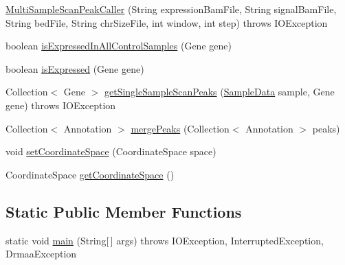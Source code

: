 \begin{DoxyCompactItemize}
\item 
\hyperlink{classbroad_1_1pda_1_1seq_1_1protection_1_1_multi_sample_scan_peak_caller_a476f82e5d174420ee13161ca508421d9}{Multi\+Sample\+Scan\+Peak\+Caller} (String expression\+Bam\+File, String signal\+Bam\+File, String bed\+File, String chr\+Size\+File, int window, int step)  throws I\+O\+Exception 
\item 
boolean \hyperlink{classbroad_1_1pda_1_1seq_1_1protection_1_1_multi_sample_scan_peak_caller_a363342cd71f370bcb563741291a2d436}{is\+Expressed\+In\+All\+Control\+Samples} (Gene gene)
\item 
boolean \hyperlink{classbroad_1_1pda_1_1seq_1_1protection_1_1_multi_sample_scan_peak_caller_a0b1b91b4c484ea9357695e7f570ccc31}{is\+Expressed} (Gene gene)
\item 
Collection$<$ Gene $>$ \hyperlink{classbroad_1_1pda_1_1seq_1_1protection_1_1_multi_sample_scan_peak_caller_a5f3dacfe2ed0ece8473039132fc28c64}{get\+Single\+Sample\+Scan\+Peaks} (\hyperlink{classbroad_1_1pda_1_1seq_1_1protection_1_1_sample_data}{Sample\+Data} sample, Gene gene)  throws I\+O\+Exception 
\item 
Collection$<$ Annotation $>$ \hyperlink{classbroad_1_1pda_1_1seq_1_1protection_1_1_multi_sample_scan_peak_caller_aba7af446c1a79202b035afa54bbcc5f5}{merge\+Peaks} (Collection$<$ Annotation $>$ peaks)
\item 
void \hyperlink{classbroad_1_1pda_1_1seq_1_1protection_1_1_multi_sample_scan_peak_caller_a2978ef854eebbaadd1de11c2e9f06404}{set\+Coordinate\+Space} (Coordinate\+Space space)
\item 
Coordinate\+Space \hyperlink{classbroad_1_1pda_1_1seq_1_1protection_1_1_multi_sample_scan_peak_caller_a69120a86f6a3c8d0607b663301c438b2}{get\+Coordinate\+Space} ()
\end{DoxyCompactItemize}
\subsection*{Static Public Member Functions}
\begin{DoxyCompactItemize}
\item 
static void \hyperlink{classbroad_1_1pda_1_1seq_1_1protection_1_1_multi_sample_scan_peak_caller_addead88839c9c7cbc25017192076424e}{main} (String\mbox{[}$\,$\mbox{]} args)  throws I\+O\+Exception, Interrupted\+Exception, Drmaa\+Exception 
\end{DoxyCompactItemize}
